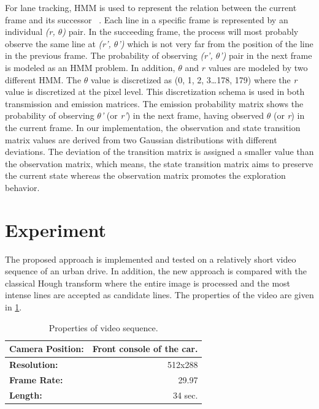 \documentclass[a4paper,oneside,10pt]{article}
\begin{document}
For lane tracking, HMM is used to represent the relation between the current frame and its successor ~\cite{rabiner86}. Each line in a specific frame is represented by an individual \textit{(r, $\theta $)} pair. In the succeeding frame, the process will most probably observe the same line at \textit{(r', $\theta $')} which is not very far from the position of the line in the previous frame. The probability of observing \textit{(r', $\theta $')} pair in the next frame is modeled as an HMM problem. In addition, \textit{$\theta $} and $r$ values are modeled by two different HMM. The \textit{$\theta $} value is discretized as (0, 1, 2, 3\dots 178, 179) where the \textit{r} value is discretized at the pixel level. This discretization schema is used in both transmission and emission matrices. The emission probability matrix shows the probability of observing \textit{$\theta $'} (or \textit{r'}) in the next frame, having observed \textit{$\theta $} (or \textit{r}) in the current frame. In our implementation, the observation and state transition matrix values are derived from two Gaussian distributions with different deviations. The deviation of the transition matrix is assigned a smaller value than the observation matrix, which means, the state transition matrix aims to preserve the current state whereas the observation matrix promotes the exploration behavior.

\section{Experiment}

The proposed approach is implemented and tested on a relatively short video sequence of an urban drive. In addition, the new approach is compared with the classical Hough transform where the entire image is processed and the most intense lines are accepted as candidate lines. The properties of the video are given in \ref{aba:table1}.

\begin{table}
\caption{Properties of video sequence.}
\centering
{\footnotesize
\begin{tabular}{|l|r|}
\hline
{\bf Camera Position:} & Front console of the car. \\
\hline
{\bf Resolution:} & 512x288 \\
\hline
{\bf Frame Rate:} & 29.97 \\
\hline
{\bf Length:} & 34 sec. \\
\hline
\end{tabular}  
}
\label{aba:table1}
\end{table}
\end{document}
